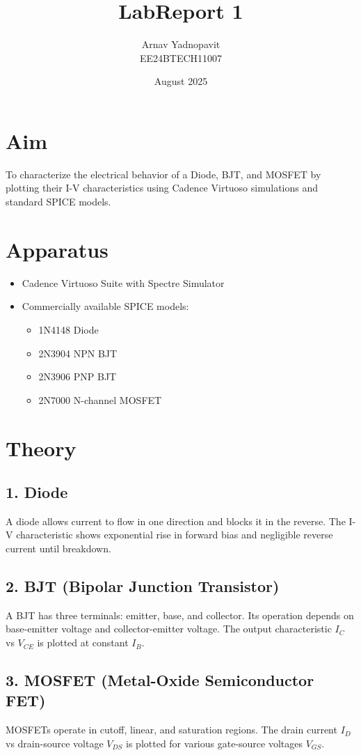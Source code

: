 \documentclass[12pt,a4paper]{article}
\title{LabReport 1}
\author{Arnav Yadnopavit\\EE24BTECH11007}
\date{August 2025}
\begin{document}
\maketitle

\section*{Aim}
To characterize the electrical behavior of a Diode, BJT, and MOSFET by plotting their I-V characteristics using Cadence Virtuoso simulations and standard SPICE models.

\section*{Apparatus}
\begin{itemize}
    \item Cadence Virtuoso Suite with Spectre Simulator
    \item Commercially available SPICE models:
    \begin{itemize}
        \item 1N4148 Diode
        \item 2N3904 NPN BJT
        \item 2N3906 PNP BJT
        \item 2N7000 N-channel MOSFET
    \end{itemize}
\end{itemize}

\section*{Theory}
\subsection*{1. Diode}
A diode allows current to flow in one direction and blocks it in the reverse. The I-V characteristic shows exponential rise in forward bias and negligible reverse current until breakdown.

\subsection*{2. BJT (Bipolar Junction Transistor)}
A BJT has three terminals: emitter, base, and collector. Its operation depends on base-emitter voltage and collector-emitter voltage. The output characteristic \( I_C \) vs \( V_{CE} \) is plotted at constant \( I_B \).

\subsection*{3. MOSFET (Metal-Oxide Semiconductor FET)}
MOSFETs operate in cutoff, linear, and saturation regions. The drain current \( I_D \) vs drain-source voltage \( V_{DS} \) is plotted for various gate-source voltages \( V_{GS} \).
\end{document}

